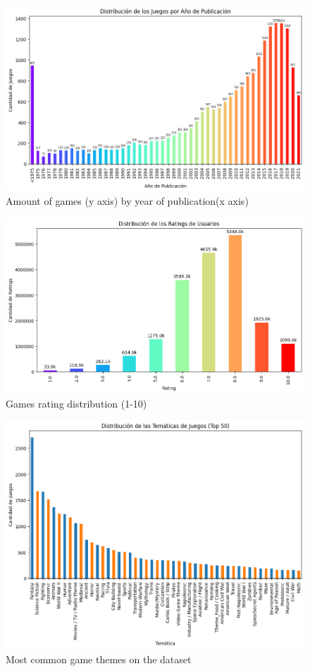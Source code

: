 \documentclass{article}
\begin{document}
\begin{figure}
    \centering
    \includegraphics[width=0.9\linewidth]{publishYear.png}
    \caption{Amount of games (y axis) by year of publication(x axis)}
    \label{fig:publishYear}
\end{figure}

\begin{figure}[h]
    \centering
    \includegraphics[width=0.9\linewidth]{distribucionRatings.png}
    \caption{Games rating distribution (1-10)}
    \label{fig:distribucionRatings}
\end{figure}

\begin{figure}[h]
    \centering
    \includegraphics[width=0.9\linewidth]{tematicasComunes.png}
    \caption{Most common game themes on the dataset}
    \label{fig:tematicasComunes}
\end{figure}
\end{document}
